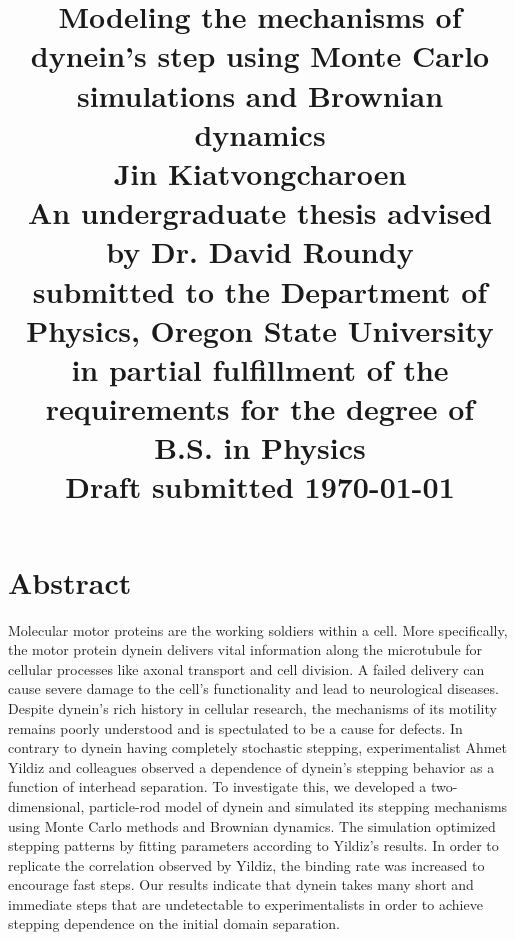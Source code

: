 \documentclass[12pt]{report}
\title{
	\Huge{Modeling the mechanisms of dynein's step using Monte Carlo simulations and Brownian dynamics}\vspace{1em}\\
	\Large{Jin Kiatvongcharoen} \vspace{0.5em}\\[2in] 
	\normalsize{An undergraduate thesis advised by Dr. David Roundy}\\
	\normalsize{submitted to the Department of Physics, Oregon State University}\\%
	\normalsize{in partial fulfillment of the requirements for the degree of}\\
	\normalsize{B.S. in Physics}\vspace{1.5 em}\\
	\normalsize{Draft submitted \today}\\


}
\date{}
\begin{document}
    \maketitle
    \onehalfspacing


	\chapter*{Abstract}
	Molecular motor proteins are the working soldiers within a cell. More specifically, the motor protein dynein delivers vital information along the microtubule for cellular processes like axonal transport and cell division. A failed delivery can cause severe damage to the cell’s functionality and lead to neurological diseases. Despite dynein's rich history in cellular research, the mechanisms of its motility remains poorly understood and is spectulated to be a cause for defects. In contrary to dynein having completely stochastic stepping, experimentalist Ahmet Yildiz and colleagues observed a dependence of dynein's stepping behavior as a function of interhead separation. To investigate this, we developed a two-dimensional, particle-rod model of dynein and simulated its stepping mechanisms using Monte Carlo methods and Brownian dynamics. The simulation optimized stepping patterns by fitting parameters according to Yildiz's results. In order to replicate the correlation observed by Yildiz, the binding rate was increased to encourage fast steps. Our results indicate that dynein takes many short and immediate steps that are undetectable to experimentalists in order to achieve stepping dependence on the initial domain separation. 
%	
%	
	
\end{document}
